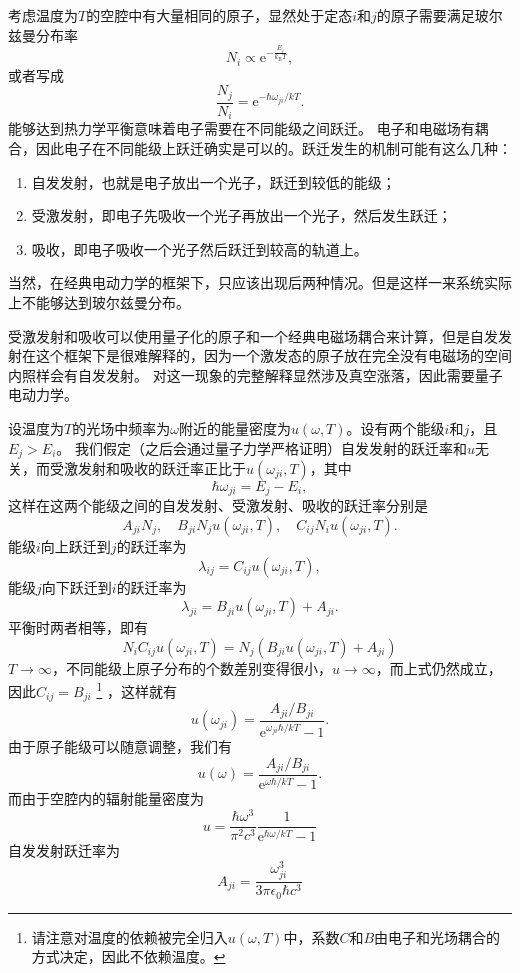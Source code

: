 \documentclass[UTF8, a4paper]{ctexart}
\newcommand*{\ee}{\mathrm{e}}
\begin{document}
考虑温度为$T$的空腔中有大量相同的原子，显然处于定态$i$和$j$的原子需要满足玻尔兹曼分布率
\[
    N_i \propto \ee^{-\frac{E_i}{k_\text{B} T}},
\]
或者写成
\[
    \frac{N_j}{N_i} = \ee^{-\hbar \omega_{ji} / kT}.
\]
能够达到热力学平衡意味着电子需要在不同能级之间跃迁。
电子和电磁场有耦合，因此电子在不同能级上跃迁确实是可以的。跃迁发生的机制可能有这么几种：
\begin{enumerate}
    \item 自发发射，也就是电子放出一个光子，跃迁到较低的能级；
    \item 受激发射，即电子先吸收一个光子再放出一个光子，然后发生跃迁；
    \item 吸收，即电子吸收一个光子然后跃迁到较高的轨道上。
\end{enumerate}

当然，在经典电动力学的框架下，只应该出现后两种情况。但是这样一来系统实际上不能够达到玻尔兹曼分布。

受激发射和吸收可以使用量子化的原子和一个经典电磁场耦合来计算，但是自发发射在这个框架下是很难解释的，因为一个激发态的原子放在完全没有电磁场的空间内照样会有自发发射。
对这一现象的完整解释显然涉及真空涨落，因此需要量子电动力学。

设温度为$T$的光场中频率为$\omega$附近的能量密度为$u(\omega, T)$。设有两个能级$i$和$j$，且$E_j > E_i$。
我们假定（之后会通过量子力学严格证明）自发发射的跃迁率和$u$无关，而受激发射和吸收的跃迁率正比于$u(\omega_{ji}, T)$，其中
\begin{equation}
    \hbar \omega_{ji} = E_j - E_i,
    \label{eq:photon-energy}
\end{equation}
这样在这两个能级之间的自发发射、受激发射、吸收的跃迁率分别是
\[
    A_{ji} N_j, \quad B_{ji} N_j u(\omega_{ji}, T), \quad C_{ij} N_i u(\omega_{ji}, T).
\]
能级$i$向上跃迁到$j$的跃迁率为
\[
    \lambda_{ij} = C_{ij} u(\omega_{ji}, T),
\]
能级$j$向下跃迁到$i$的跃迁率为
\[
    \lambda_{ji} = B_{ji} u(\omega_{ji}, T) + A_{ji}.
\]
平衡时两者相等，即有
\[
    N_i C_{ij} u(\omega_{ji}, T) = N_j (B_{ji} u(\omega_{ji}, T) + A_{ji})
\]
$T \to \infty$，不同能级上原子分布的个数差别变得很小，$u \to \infty$，而上式仍然成立，因此$C_{ij} = B_{ji}$%
\footnote{请注意对温度的依赖被完全归入$u(\omega, T)$中，系数$C$和$B$由电子和光场耦合的方式决定，因此不依赖温度。}%
，这样就有
\[
    u(\omega_{ji}) = \frac{A_{ji} / B_{ji}}{\ee^{\omega_{ji} \hbar / k T} - 1}.
\]
由于原子能级可以随意调整，我们有
\[
    u(\omega) = \frac{A_{ji} / B_{ji}}{\ee^{\omega \hbar / k T} - 1}.
\]
而由于空腔内的辐射能量密度为
\[
    u = \frac{\hbar \omega^3}{\pi^2 c^3} \frac{1}{\ee^{\hbar \omega / kT} - 1}
\]
自发发射跃迁率为
\[
    A_{ji} = \frac{\omega_{ji}^3}{3\pi \epsilon_0 \hbar c^3}
\]
\end{document}
